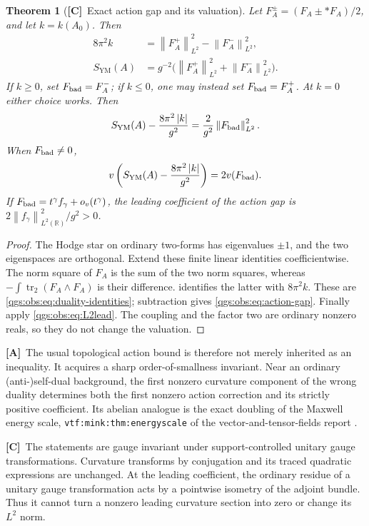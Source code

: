 \documentclass[11pt,oneside]{article}
\numberwithin{equation}{section}
\theoremstyle{plain}
\newtheorem{theorem}{Theorem}[section]
\theoremstyle{definition}
\theoremstyle{remark}
\newcommand{\R}{\mathbb R}
\newcommand{\SYM}{S_{\mathrm{YM}}}
\DeclareMathOperator{\tr}{tr}
\newcommand{\abs}[1]{\left|#1\right|}
\newcommand{\norm}[1]{\left\|#1\right\|}
\newcommand{\TC}{\textcolor{TierC}{\textsf{\bfseries[C]}}}
\newcommand{\TA}{\textcolor{TierA}{\textsf{\bfseries[A]}}}
\begin{document}
\begin{theorem}[\TC\ Exact action gap and its valuation]\label{qgs:obs:thm:action}
Let $F_A^\pm=(F_A\pm *F_A)/2$, and let $k=k(A_0)$. Then
\begin{align}\label{qgs:obs:eq:duality-identities}
 8\pi^2k&=\norm{F_A^+}_{L^2}^2-\norm{F_A^-}_{L^2}^2,\\
 \SYM(A)&=g^{-2}\bigl(\norm{F_A^+}_{L^2}^2+
                         \norm{F_A^-}_{L^2}^2\bigr).\nonumber
\end{align}
If $k\ge0$, set $F_{\rm bad}=F_A^-$; if $k\le0$, one may instead set $F_{\rm bad}=F_A^+$. At $k=0$ either choice works. Then
\begin{equation}\label{qgs:obs:eq:action-gap}
 \SYM(A)-\frac{8\pi^2\abs k}{g^2}=\frac2{g^2}\norm{F_{\rm bad}}_{L^2}^2.
\end{equation}
When $F_{\rm bad}\ne0$,
\begin{equation}\label{qgs:obs:eq:action-value}
 v\left(\SYM(A)-\frac{8\pi^2\abs k}{g^2}\right)
 =2v(F_{\rm bad}).
\end{equation}
If $F_{\rm bad}=t^\gamma f_\gamma+o_v(t^\gamma)$, the leading coefficient of the action gap is $2\norm{f_\gamma}_{L^2(\R)}^2/g^2>0$.
\end{theorem}
\begin{proof}
The Hodge star on ordinary two-forms has eigenvalues $\pm1$, and the two eigenspaces are orthogonal. Extend these finite linear identities coefficientwise. The norm square of $F_A$ is the sum of the two norm squares, whereas $-\int\tr_2(F_A\wedge F_A)$ is their difference.  identifies the latter with $8\pi^2k$. These are \eqref{qgs:obs:eq:duality-identities}; subtraction gives \eqref{qgs:obs:eq:action-gap}. Finally apply \eqref{qgs:obs:eq:L2lead}. The coupling and the factor two are ordinary nonzero reals, so they do not change the valuation.
\end{proof}

\TA\ The usual topological action bound is therefore not merely inherited as an inequality. It acquires a sharp order-of-smallness invariant. Near an ordinary (anti-)self-dual background, the first nonzero curvature component of the wrong duality determines both the first nonzero action correction and its strictly positive coefficient. Its abelian analogue is the exact doubling of the Maxwell energy scale, \texttt{vtf:mink:thm:energyscale} of the vector-and-tensor-fields report \cite{repoVTF}.

\TC\ The statements are gauge invariant under support-controlled unitary gauge transformations. Curvature transforms by conjugation and its traced quadratic expressions are unchanged. At the leading coefficient, the ordinary residue of a unitary gauge transformation acts by a pointwise isometry of the adjoint bundle. Thus it cannot turn a nonzero leading curvature section into zero or change its $L^2$ norm.
\end{document}
